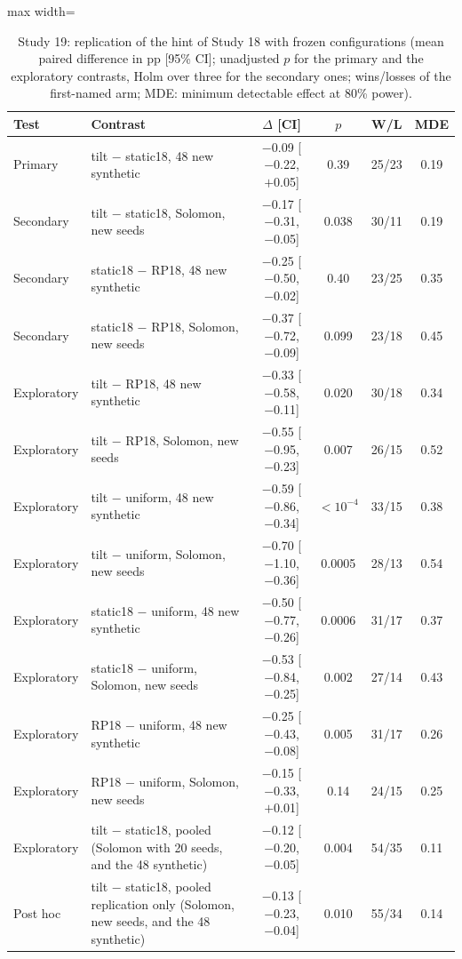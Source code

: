 \begin{table}[t]
\caption{Study 19: replication of the hint of Study 18 with frozen configurations (mean paired difference in pp [95\% CI]; unadjusted $p$ for the primary and the exploratory contrasts, Holm over three for the secondary ones; wins/losses of the first-named arm; MDE: minimum detectable effect at 80\% power).}\label{tab:s19}
\centering
\small
\begin{adjustbox}{max width=\linewidth}
\begin{tabular}{llcccc}
\toprule
Test & Contrast & $\Delta$ [CI] & $p$ & W/L & MDE \\
\midrule
Primary & tilt $-$ static18, 48 new synthetic & $-$0.09 [$-$0.22, $+$0.05] & 0.39 & 25/23 & 0.19 \\
Secondary & tilt $-$ static18, Solomon, new seeds & $-$0.17 [$-$0.31, $-$0.05] & 0.038 & 30/11 & 0.19 \\
Secondary & static18 $-$ RP18, 48 new synthetic & $-$0.25 [$-$0.50, $-$0.02] & 0.40 & 23/25 & 0.35 \\
Secondary & static18 $-$ RP18, Solomon, new seeds & $-$0.37 [$-$0.72, $-$0.09] & 0.099 & 23/18 & 0.45 \\
Exploratory & tilt $-$ RP18, 48 new synthetic & $-$0.33 [$-$0.58, $-$0.11] & 0.020 & 30/18 & 0.34 \\
Exploratory & tilt $-$ RP18, Solomon, new seeds & $-$0.55 [$-$0.95, $-$0.23] & 0.007 & 26/15 & 0.52 \\
Exploratory & tilt $-$ uniform, 48 new synthetic & $-$0.59 [$-$0.86, $-$0.34] & \ensuremath{<10^{-4}} & 33/15 & 0.38 \\
Exploratory & tilt $-$ uniform, Solomon, new seeds & $-$0.70 [$-$1.10, $-$0.36] & 0.0005 & 28/13 & 0.54 \\
Exploratory & static18 $-$ uniform, 48 new synthetic & $-$0.50 [$-$0.77, $-$0.26] & 0.0006 & 31/17 & 0.37 \\
Exploratory & static18 $-$ uniform, Solomon, new seeds & $-$0.53 [$-$0.84, $-$0.25] & 0.002 & 27/14 & 0.43 \\
Exploratory & RP18 $-$ uniform, 48 new synthetic & $-$0.25 [$-$0.43, $-$0.08] & 0.005 & 31/17 & 0.26 \\
Exploratory & RP18 $-$ uniform, Solomon, new seeds & $-$0.15 [$-$0.33, $+$0.01] & 0.14 & 24/15 & 0.25 \\
Exploratory & tilt $-$ static18, pooled (Solomon with 20 seeds, and the 48 synthetic) & $-$0.12 [$-$0.20, $-$0.05] & 0.004 & 54/35 & 0.11 \\
Post hoc & tilt $-$ static18, pooled replication only (Solomon, new seeds, and the 48 synthetic) & $-$0.13 [$-$0.23, $-$0.04] & 0.010 & 55/34 & 0.14 \\
\bottomrule
\end{tabular}
\end{adjustbox}
\end{table}
